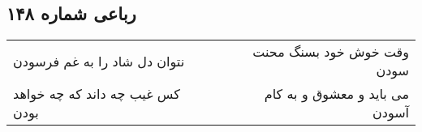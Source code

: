 \begin{center}
\section*{رباعی شماره ۱۴۸}
\label{sec:sh148}
\begin{longtable}{l p{0.5cm} r}
نتوان دل شاد را به غم فرسودن
&&
وقت خوش خود بسنگ محنت سودن
\\
کس غیب چه داند که چه خواهد بودن
&&
می باید و معشوق و به کام آسودن
\\
\end{longtable}
\end{center}
